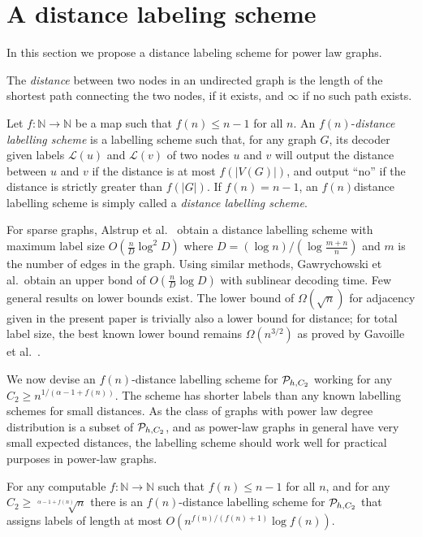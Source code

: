 \section{A distance labeling scheme}\label{Sec:Distance}
In this section we propose a distance labeling scheme for power law graphs. 

The \emph{distance} between two nodes in an undirected graph is the length of the shortest path connecting
the two nodes, if it exists, and $\infty$ if no such path exists.

Let $f : \mathbb{N} \longrightarrow \mathbb{N}$ be a map such that
$f(n) \leq  n -1$ for all $n$. An $f(n)$-\emph{distance labelling scheme} is a labelling
scheme such that, for any graph $G$, its decoder given labels $\mathcal{L}(u)$ and $\mathcal{L}(v)$ of two nodes $u$ and $v$
will output the distance between $u$ and $v$ if the distance is at most $f(\vert V(G) \vert)$, and output ``no'' if the distance
is  strictly greater than $f(\vert G \vert)$. If $f(n) = n-1$,
an $f(n)$distance labelling scheme is simply called a \emph{distance labelling scheme}.

For sparse graphs,
Alstrup et al.\ \cite{DBLP:journals/corr/AlstrupDKP15} obtain a distance labelling scheme with maximum label size
$O(\frac{n}{D} \log^2 D)$ where $D = (\log n)/(\log \frac{m+n}{n})$ and $m$ is the number of edges
in the graph.  Using similar methods, Gawrychowski et al.\ obtain an upper bond of \cite{DBLP:journals/corr/GawrychowskiKU15}
$O(\frac{n}{D} \log D)$ with sublinear decoding time. Few general results on lower bounds exist. The lower bound of $\Omega(\sqrt{n})$ for adjacency given in the present paper is trivially also a lower bound for distance; for total label size, the best known lower bound remains $\Omega(n^{3/2})$ as proved by Gavoille et al.~\cite{Gavoille2001}.

We now devise an $f(n)$-distance labelling scheme for $ \mathcal{P}_{h,C_2}$ working for any $C_2 \geq n^{1/(\alpha - 1 +f(n))}$.
The scheme has shorter labels than any known labelling schemes for small distances. As
the class of graphs with power law degree distribution is a subset of $ \mathcal{P}_{h,C_2}$, and as power-law graphs in general
have very small expected distances, the labelling scheme should work well for practical purposes in power-law graphs.

\begin{lemma}\label{lem:sparse_small_dist}
For any computable $f : \mathbb{N} \longrightarrow \mathbb{N}$ such that
$f(n) \leq n -1$ for all $n$, and for any $C_2 \geq \sqrt[\alpha-1+f(n)]{n}$ there is an $f(n)$-distance labelling scheme for $ \mathcal{P}_{h,C_2}$
that assigns labels of length at most $O(n^{f(n)/(f(n) + 1)} \log f(n))$.
\end{lemma}

